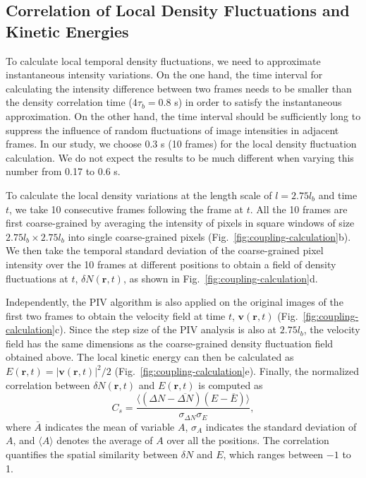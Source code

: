 \subsection{Correlation of Local Density Fluctuations and Kinetic Energies}

To calculate local temporal density fluctuations, we need to approximate instantaneous intensity variations. On the one hand, the time interval for calculating the intensity difference between two frames needs to be smaller than the density correlation time ($4\tau_b = 0.8$ s) in order to satisfy the instantaneous approximation. On the other hand, the time interval should be sufficiently long to suppress the influence of random fluctuations of image intensities in adjacent frames. In our study, we choose 0.3 s (10 frames) for the local density fluctuation calculation. We do not expect the results to be much different when varying this number from 0.17 to 0.6 s.

To calculate the local density variations at the length scale of $l = 2.75l_b$ and time $t$, we take 10 consecutive frames following the frame at $t$. All the 10 frames are first coarse-grained by averaging the intensity of pixels in square windows of size $2.75l_b \times 2.75l_b$ into single coarse-grained pixels (Fig.~\ref{fig:coupling-calculation}b). We then take the temporal standard deviation of the coarse-grained pixel intensity over the 10 frames at different positions to obtain a field of density fluctuations at $t$, $\delta N(\bm{r},t)$, as shown in Fig.~\ref{fig:coupling-calculation}d.

Independently, the PIV algorithm is also applied on the original images of the first two frames to obtain the velocity field at time $t$, $\bm{v}(\bm{r},t)$ (Fig.~\ref{fig:coupling-calculation}c). Since the step size of the PIV analysis is also at $2.75l_b$, the velocity field has the same dimensions as the coarse-grained density fluctuation field obtained above. The local kinetic energy can then be calculated as $E(\bm{r},t)=|\bm{v}(\bm{r},t)|^2/2$ (Fig.~\ref{fig:coupling-calculation}e). Finally, the normalized correlation between $\delta N(\bm{r},t)$ and $E(\bm{r},t)$ is computed as
\begin{equation}
C_s = \frac{\langle(\Delta N-\overline{\Delta N})(E-\overline{E})\rangle}{\sigma_{\Delta N}\sigma_{E}},
\end{equation}
where $\bar A$ indicates the mean of variable $A$, $\sigma_A$ indicates the standard deviation of $A$, and $\langle A \rangle$ denotes the average of $A$ over all the positions. The correlation quantifies the spatial similarity between $\delta N$ and $E$, which ranges between $-1$ to 1.

